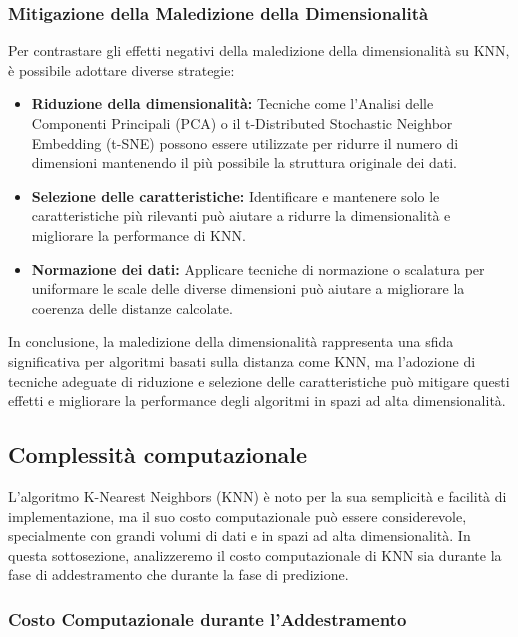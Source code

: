 \subsubsection{Mitigazione della Maledizione della Dimensionalità}

Per contrastare gli effetti negativi della maledizione della dimensionalità su KNN, è possibile adottare diverse strategie:

\begin{itemize}
    \item \textbf{Riduzione della dimensionalità:} Tecniche come l'Analisi delle Componenti Principali (PCA) o il t-Distributed Stochastic Neighbor Embedding (t-SNE) possono essere utilizzate per ridurre il numero di dimensioni mantenendo il più possibile la struttura originale dei dati.
    
    \item \textbf{Selezione delle caratteristiche:} Identificare e mantenere solo le caratteristiche più rilevanti può aiutare a ridurre la dimensionalità e migliorare la performance di KNN.

    \item \textbf{Normazione dei dati:} Applicare tecniche di normazione o scalatura per uniformare le scale delle diverse dimensioni può aiutare a migliorare la coerenza delle distanze calcolate.
\end{itemize}

In conclusione, la maledizione della dimensionalità rappresenta una sfida significativa per algoritmi basati sulla distanza come KNN, ma l'adozione di tecniche adeguate di riduzione e selezione delle caratteristiche può mitigare questi effetti e migliorare la performance degli algoritmi in spazi ad alta dimensionalità.

\subsection{Complessità computazionale}
L'algoritmo K-Nearest Neighbors (KNN) è noto per la sua semplicità e facilità di implementazione, ma il suo costo computazionale può essere considerevole, specialmente con grandi volumi di dati e in spazi ad alta dimensionalità. In questa sottosezione, analizzeremo il costo computazionale di KNN sia durante la fase di addestramento che durante la fase di predizione.

\subsubsection{Costo Computazionale durante l'Addestramento}

